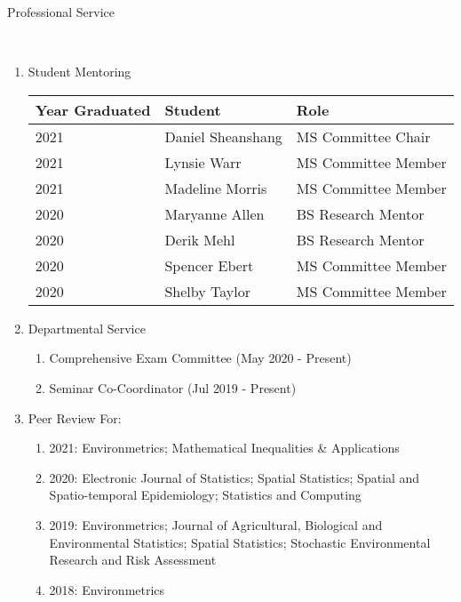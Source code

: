 \documentclass[12pt]{article}
\newcommand{\head}[1]{ %
    \bigskip %
    \begin{large}\begin{bf}{#1}\end{bf}\end{large} %

    \ \\ [-1.3cm] %

    \hrulefill}
\begin{document}
\head{Professional Service}
\begin{enumerate}[label=$\bullet$]

\item Student Mentoring

\begin{table}[H]
\centering
\begin{tabular}{lll}
  \hline
Year Graduated & Student & Role \\ 
  \hline
2021  & Daniel Sheanshang & MS Committee Chair  \\ 
2021  & Lynsie Warr & MS Committee Member  \\ 
2021  & Madeline Morris & MS Committee Member  \\ 
2020  & Maryanne Allen & BS Research Mentor  \\ 
2020  & Derik Mehl & BS Research Mentor \\ 
2020  & Spencer Ebert & MS Committee Member  \\ 
2020  & Shelby Taylor & MS Committee Member  \\ 
   \hline
\end{tabular}
\end{table}

\item Departmental Service
\begin{enumerate}[label=$\cdot$]
\item Comprehensive Exam Committee (May 2020 - Present)
\item Seminar Co-Coordinator (Jul 2019 - Present)
\end{enumerate}

\item Peer Review For:
\begin{enumerate}[label=$\cdot$]
\item 2021: Environmetrics; Mathematical Inequalities \& Applications
\item 2020: Electronic Journal of Statistics; Spatial Statistics; Spatial and Spatio-temporal Epidemiology; Statistics and Computing
\item 2019: Environmetrics; Journal of Agricultural, Biological and Environmental Statistics; Spatial Statistics; Stochastic Environmental Research and Risk Assessment 
\item 2018: Environmetrics 
\end{enumerate}
\end{enumerate}
\end{document}
